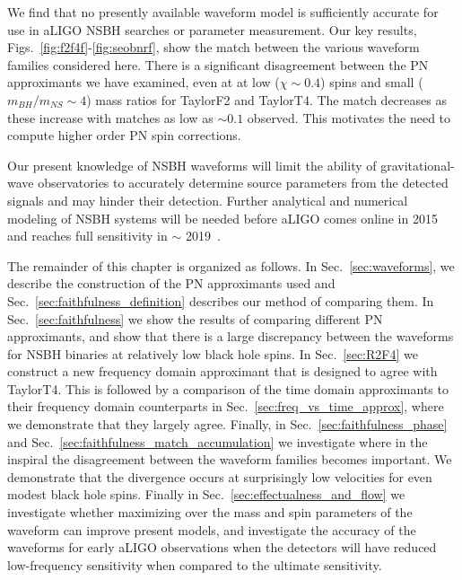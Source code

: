 We find that no presently available waveform model is sufficiently accurate for use
in \ac{aLIGO} \ac{NSBH} searches or parameter measurement. Our key results, Figs.~\ref{fig:f2f4f}-\ref{fig:seobnrf},
show the match between the various waveform families considered here.
There is a significant disagreement between the \ac{PN} approximants we
have examined, even at at low ($\chi \sim 0.4$) spins and small ($m_{BH}/m_{NS} \sim 4$) mass ratios for TaylorF2 and TaylorT4.
The match decreases as these increase with matches as low as $\sim 0.1$ observed. This motivates
the need to compute higher order \ac{PN} spin corrections.  

Our present knowledge of \ac{NSBH} waveforms will limit the
ability of gravitational-wave observatories to accurately determine source
parameters from the detected signals and may hinder their detection.
Further analytical and numerical modeling of \ac{NSBH} systems will be needed
before \ac{aLIGO} comes online in 2015 and reaches full sensitivity in $\sim$
2019~\cite{Aasi:2013wya}.

The remainder of this chapter is organized as follows.  In
Sec.~\ref{sec:waveforms}, we describe the construction of the \ac{PN}
approximants used and Sec.~\ref{sec:faithfulness_definition} describes our
method of comparing them.  In Sec.~\ref{sec:faithfulness} we show the results
of comparing different \ac{PN} approximants, and show that there is a large
discrepancy between the waveforms for \ac{NSBH} binaries at relatively low
black hole spins. In Sec.~\ref{sec:R2F4} we construct a new frequency domain
approximant that is designed to agree with TaylorT4. This is followed by a
comparison of the time domain approximants to their frequency domain
counterparts in Sec.~\ref{sec:freq_vs_time_approx}, where we demonstrate that
they largely agree. Finally, in Sec.~\ref{sec:faithfulness_phase} and
Sec.~\ref{sec:faithfulness_match_accumulation} we investigate where in the
inspiral the disagreement between the waveform families becomes important. We
demonstrate that the divergence occurs at surprisingly low velocities for even
modest black hole spins. Finally in Sec.~\ref{sec:effectualness_and_flow} we
investigate whether maximizing over the mass and spin parameters of the
waveform can improve present models, and investigate the accuracy of the
waveforms for early aLIGO observations when the detectors will have reduced
low-frequency sensitivity when compared to the ultimate sensitivity. 



